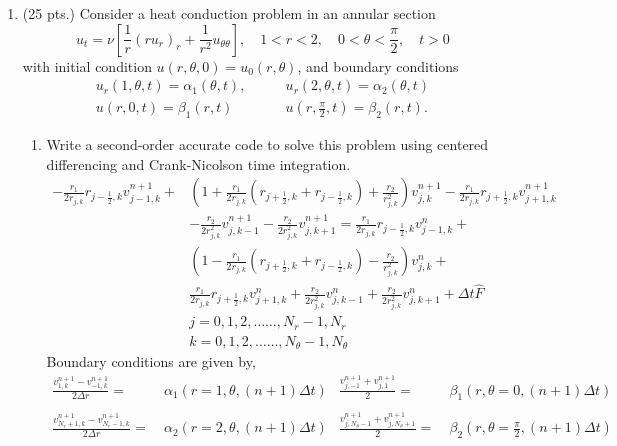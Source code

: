 \documentclass[11pt]{article}
\newcommand{\dt}{\Delta t}
\newcommand{\bra}[1]{\left(#1\right)}
\newcommand{\h}{\frac{1}{2}}
\begin{document}
\begin{enumerate}
  \item (25 pts.) {\color{red}Consider a heat conduction problem in an annular section}
  \[
    u_{t} = \nu\left[\frac{1}{r}(ru_r)_r+\frac{1}{r^2}u_{\theta\theta}\right], \quad 1<r<2, \quad 0<\theta<\frac{\pi}{2}, \quad t>0
  \]
  {\color{red}with initial condition }$u(r,\theta,0)=u_0(r,\theta)${\color{red}, and boundary conditions}
  \begin{align*}
    u_r(1,\theta,t) = \alpha_1(\theta,t), \qquad & u_r(2,\theta,t) = \alpha_2(\theta,t) \\
    u(r,0,t) = \beta_1(r,t) \qquad & u(r,\frac{\pi}{2},t) = \beta_2(r,t).
  \end{align*}
  \begin{enumerate}
    \item {\color{blue}Write a second-order accurate code to solve this problem using centered differencing and Crank-Nicolson time integration.} \\
    \begin{align*}
        -\frac{r_1}{2r_{j,k}}r_{j-\h,k}v^{n+1}_{j-1,k} +& \bra{1+\frac{r_1}{2r_{j,k}} \bra{r_{j+\h,k}+r_{j-\h,k}} + \frac{r_2}{r^2_{j,k}} }v^{n+1}_{j,k} - \frac{r_1}{2r_{j,k}}r_{j+\h,k}v^{n+1}_{j+1,k}  \\
        &-\frac{r_2}{2r^2_{j,k}}v^{n+1}_{j,k-1} - \frac{r_2}{2r^2_{j,k}}v^{n+1}_{j,k+1} = \frac{r_1}{2r_{j,k}}r_{j-\h,k}v^{n}_{j-1,k} +\\ &\bra{1-\frac{r_1}{2r_{j,k}}\bra{r_{j+\h,k}+r_{j-\h,k}}-\frac{r_2}{r^2_{j,k}}}v^n_{j,k}+ \\
        & \frac{r_1}{2r_{j,k}}r_{j+\h,k}v^n_{j+1,k} + \frac{r_2}{2r^2_{j,k}}v^n_{j,k-1} + \frac{r_2}{2r^2_{j,k}}v^n_{j,k+1} + \dt\hat{F} \\
        & j=0,1,2,\ldots \ldots,N_r-1,N_r \\
        & k=0,1,2,\ldots \ldots, N_\theta -1, N_\theta 
    \end{align*}
    Boundary conditions are given by,
    \begin{align*}
        \frac{v^{n+1}_{1,k}-v^{n+1}_{-1,k}}{2\Delta r} =& \ \alpha_1\bra{r=1,\theta,(n+1)\Delta t} & \frac{v^{n+1}_{j,-1}+v^{n+1}_{j,1}}{2} =& \ \beta_1\bra{r,\theta=0,(n+1)\Delta t} \\ \\
        \frac{v^{n+1}_{N_r+1,k}-v^{n+1}_{N_r-1,k}}{2\Delta r} =& \ \alpha_2\bra{r=2,\theta,(n+1)\Delta t} & \frac{v^{n+1}_{j,N_\theta-1}+v^{n+1}_{j,N_\theta +1}}{2} =& \ \beta_2\bra{r,\theta=\frac{\pi}{2},(n+1)\Delta t} \\

\end{align*}
\end{enumerate}
\end{enumerate}
\end{document}
